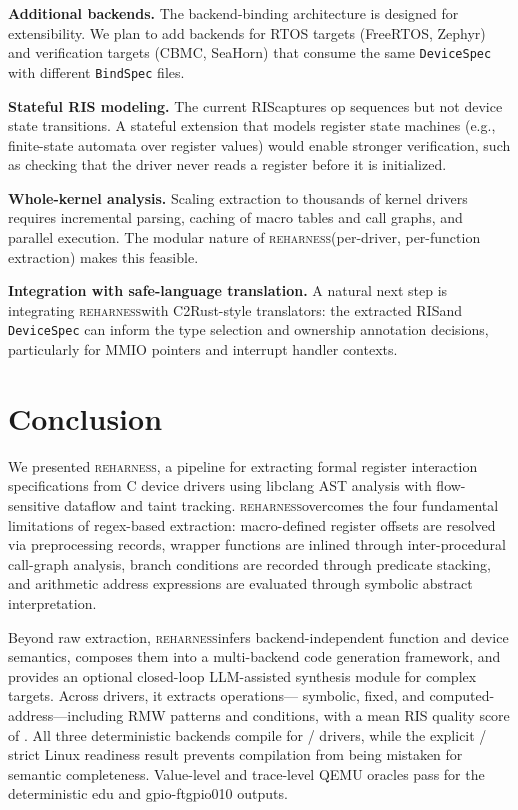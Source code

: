 \documentclass[sigconf,review]{acmart}
\newcommand{\reharness}{\textsc{reharness}}
\newcommand{\rislang}{RIS}
\begin{document}
\textbf{Additional backends.} The backend-binding architecture is designed for extensibility. We plan to add backends for RTOS targets (FreeRTOS, Zephyr) and verification targets (CBMC, SeaHorn) that consume the same \texttt{DeviceSpec} with different \texttt{BindSpec} files.

\textbf{Stateful RIS modeling.} The current \rislang captures op sequences but not device state transitions. A stateful extension that models register state machines (e.g., finite-state automata over register values) would enable stronger verification, such as checking that the driver never reads a register before it is initialized.

\textbf{Whole-kernel analysis.} Scaling extraction to thousands of kernel drivers requires incremental parsing, caching of macro tables and call graphs, and parallel execution. The modular nature of \reharness (per-driver, per-function extraction) makes this feasible.

\textbf{Integration with safe-language translation.} A natural next step is integrating \reharness with C2Rust-style translators: the extracted \rislang and \texttt{DeviceSpec} can inform the type selection and ownership annotation decisions, particularly for MMIO pointers and interrupt handler contexts.

\section{Conclusion}

We presented \reharness, a pipeline for extracting formal register interaction specifications from C device drivers using libclang AST analysis with flow-sensitive dataflow and taint tracking. \reharness overcomes the four fundamental limitations of regex-based extraction: macro-defined register offsets are resolved via preprocessing records, wrapper functions are inlined through inter-procedural call-graph analysis, branch conditions are recorded through predicate stacking, and arithmetic address expressions are evaluated through symbolic abstract interpretation.

Beyond raw extraction, \reharness infers backend-independent function and device semantics, composes them into a multi-backend code generation framework, and provides an optional closed-loop LLM-assisted synthesis module for complex targets. Across \EvalDrivers{} drivers, it extracts \EvalOps{} operations---\EvalSymbolic{} symbolic, \EvalFixed{} fixed, and \EvalComputed{} computed-address---including \EvalRMW{} RMW patterns and \EvalConditions{} conditions, with a mean RIS quality score of \EvalMeanRIS{}. All three deterministic backends compile for \EvalDrivers{}/\EvalDrivers{} drivers, while the explicit \LinuxReadyCount{}/\EvalDrivers{} strict Linux readiness result prevents compilation from being mistaken for semantic completeness. Value-level and trace-level QEMU oracles pass for the deterministic edu and gpio-ftgpio010 outputs.
\end{document}
